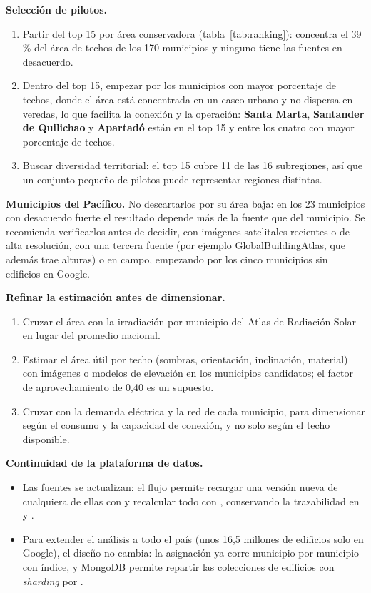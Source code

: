 \textbf{Selección de pilotos.}
\begin{enumerate}
  \item Partir del top 15 por área conservadora (tabla~\ref{tab:ranking}):
        concentra el 39\,\% del área de techos de los 170 municipios y ninguno
        tiene las fuentes en desacuerdo.
  \item Dentro del top 15, empezar por los municipios con mayor porcentaje de
        techos, donde el área está concentrada en un casco urbano y no
        dispersa en veredas, lo que facilita la conexión y la operación:
        \textbf{Santa Marta}, \textbf{Santander de Quilichao} y
        \textbf{Apartadó} están en el top 15 y entre los cuatro con mayor
        porcentaje de techos.
  \item Buscar diversidad territorial: el top 15 cubre 11 de las 16
        subregiones, así que un conjunto pequeño de pilotos puede
        representar regiones distintas.
\end{enumerate}

\textbf{Municipios del Pacífico.} No descartarlos por su área baja: en los 23
municipios con desacuerdo fuerte el resultado depende más de la fuente que del
municipio. Se recomienda verificarlos antes de decidir, con imágenes
satelitales recientes o de alta resolución, con una tercera fuente (por
ejemplo GlobalBuildingAtlas, que además trae alturas) o en campo, empezando
por los cinco municipios sin edificios en Google.

\textbf{Refinar la estimación antes de dimensionar.}
\begin{enumerate}
  \item Cruzar el área con la irradiación por municipio del Atlas de
        Radiación Solar~\cite{atlas} en lugar del promedio nacional.
  \item Estimar el área útil por techo (sombras, orientación, inclinación,
        material) con imágenes o modelos de elevación en los municipios
        candidatos; el factor de aprovechamiento de 0,40 es un supuesto.
  \item Cruzar con la demanda eléctrica y la red de cada municipio, para
        dimensionar según el consumo y la capacidad de conexión, y no solo
        según el techo disponible.
\end{enumerate}

\textbf{Continuidad de la plataforma de datos.}
\begin{itemize}
  \item Las fuentes se actualizan: el flujo permite recargar una versión
        nueva de cualquiera de ellas con  y recalcular
        todo con , conservando la trazabilidad en
         y .
  \item Para extender el análisis a todo el país (unos 16,5 millones de
        edificios solo en Google), el diseño no cambia: la asignación ya
        corre municipio por municipio con índice, y MongoDB permite repartir
        las colecciones de edificios con \emph{sharding} por
        .
\end{itemize}

